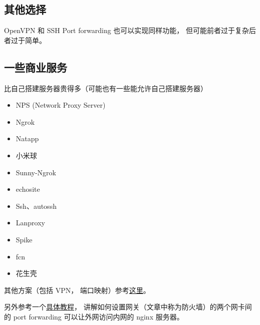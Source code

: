 \subsection{其他选择}
OpenVPN 和 SSH Port forwarding 也可以实现同样功能， 但可能前者过于复杂后者过于简单。

\subsection{一些商业服务}
比自己搭建服务器贵得多（可能也有一些能允许自己搭建服务器）
\begin{itemize}
\item NPS (Network Proxy Server)
\item Ngrok
\item Natapp
\item 小米球
\item Sunny-Ngrok
\item echosite
\item Ssh、autossh
\item Lanproxy
\item Spike
\item fcn
\item 花生壳
\end{itemize}

其他方案（包括 VPN， 端口映射）参考\href{https://johackim.com/how-to-expose-local-server-behind-firewall}{这里}。

另外参考一个\href{https://www.digitalocean.com/community/tutorials/how-to-forward-ports-through-a-linux-gateway-with-iptables}{具体教程}， 讲解如何设置网关（文章中称为防火墙）的两个网卡间的 port forwarding 可以让外网访问内网的 nginx 服务器。 

